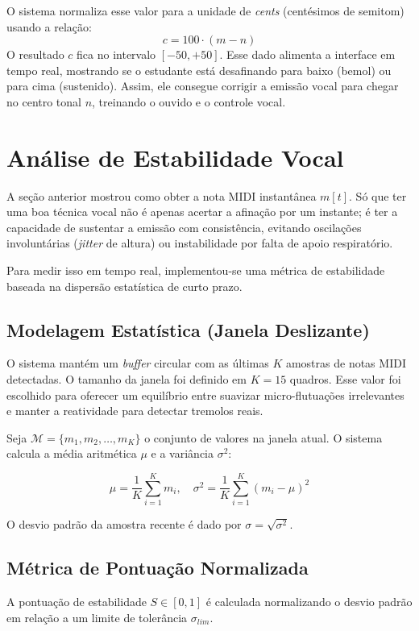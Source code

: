 \documentclass[11pt, a4paper]{article}
\theoremstyle{plain}
\theoremstyle{definition}
\begin{document}
O sistema normaliza esse valor para a unidade de \textit{cents} (centésimos de semitom) usando a relação:
\begin{equation}
    c = 100 \cdot (m - n)
\end{equation}
O resultado $c$ fica no intervalo $[-50, +50]$. Esse dado alimenta a interface em tempo real, mostrando se o estudante está desafinando para baixo (bemol) ou para cima (sustenido). Assim, ele consegue corrigir a emissão vocal para chegar no centro tonal $n$, treinando o ouvido e o controle vocal.

\section{Análise de Estabilidade Vocal}

A seção anterior mostrou como obter a nota MIDI instantânea $m[t]$. Só que ter uma boa técnica vocal não é apenas acertar a afinação por um instante; é ter a capacidade de sustentar a emissão com consistência, evitando oscilações involuntárias (\textit{jitter} de altura) ou instabilidade por falta de apoio respiratório.

Para medir isso em tempo real, implementou-se uma métrica de estabilidade baseada na dispersão estatística de curto prazo.

\subsection{Modelagem Estatística (Janela Deslizante)}
O sistema mantém um \textit{buffer} circular com as últimas $K$ amostras de notas MIDI detectadas. O tamanho da janela foi definido em \textbf{$K=15$} quadros. Esse valor foi escolhido para oferecer um equilíbrio entre suavizar micro-flutuações irrelevantes e manter a reatividade para detectar tremolos reais.

Seja $\mathcal{M} = \{m_1, m_2, \dots, m_K\}$ o conjunto de valores na janela atual. O sistema calcula a média aritmética $\mu$ e a variância $\sigma^2$:

\begin{equation}
    \mu = \frac{1}{K} \sum_{i=1}^{K} m_i, \quad \sigma^2 = \frac{1}{K} \sum_{i=1}^{K} (m_i - \mu)^2
\end{equation}

O desvio padrão da amostra recente é dado por $\sigma = \sqrt{\sigma^2}$.

\subsection{Métrica de Pontuação Normalizada}
A pontuação de estabilidade $S \in [0, 1]$ é calculada normalizando o desvio padrão em relação a um limite de tolerância $\sigma_{lim}$.
\end{document}
